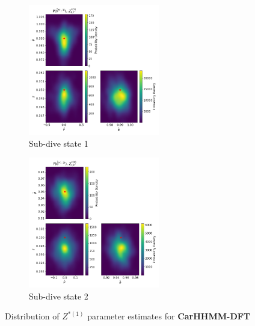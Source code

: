 \documentclass[12pt]{TD-CJS}
\begin{document}
\begin{figure}[ht]
	\centering
	\begin{subfigure}[t]{0.45\textwidth}
        \centering
        \includegraphics[width=2.25in]{../Plots/hhmm_FV_MLE_density_A_0_0.png}
        \caption{Sub-dive state 1}
    \end{subfigure}
    \begin{subfigure}[t]{0.45\textwidth}
        \centering
        \includegraphics[width=2.25in]{../Plots/hhmm_FV_MLE_density_A_0_1.png}
        \caption{Sub-dive state 2}
    \end{subfigure}
    \caption{Distribution of $Z^{*(1)}$ parameter estimates for \textbf{CarHHMM-DFT}}
\end{figure}
\end{document}
